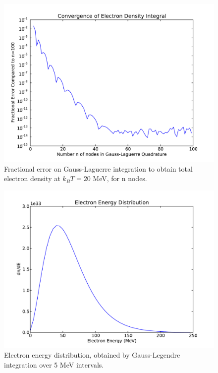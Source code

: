 \documentclass{article}
\begin{document}
\begin{figure}[h]
  \begin{center}
     \includegraphics[width=\textwidth]{laguerre}
  \end{center}
  \caption{Fractional error on Gauss-Laguerre integration to obtain total electron density at $k_BT=20$ MeV,
	   for n nodes.}
  \label{fig:laguerre}
\end{figure}

\begin{figure}[h]
  \begin{center}
     \includegraphics[width=\textwidth]{legendre}
  \end{center}
  \caption{Electron energy distribution, obtained by Gauss-Legendre integration over 5 MeV intervals.}
  \label{fig:legendre}
\end{figure}
\end{document}
